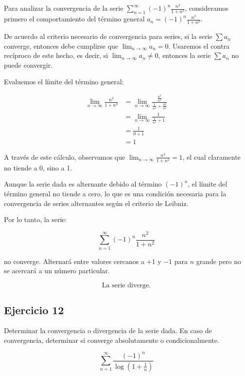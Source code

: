 \documentclass{article}
\begin{document}
    Para analizar la convergencia de la serie \(\sum_{n=1}^{\infty}(-1)^{n} \frac{n^{2}}{1+n^{2}}\), consideramos primero el comportamiento del término general \(a_n = (-1)^n \frac{n^2}{1+n^2}\).

    De acuerdo al criterio necesario de convergencia para series, si la serie \(\sum a_{n}\) converge, entonces debe cumplirse que \(\lim_{n \rightarrow \infty} a_{n} = 0\). Usaremos el contra recíproco de este hecho, es decir, si \(\lim_{n \rightarrow \infty} a_{n} \neq 0\), entonces la serie \(\sum a_{n}\) no puede convergir.

    Evaluemos el límite del término general:

    \begin{align*}
    \lim_{n \rightarrow \infty} \frac{n^{2}}{1+n^{2}} & = \lim_{n \rightarrow \infty} \frac{\frac{n^{2}}{n^{2}}}{\frac{1}{n^{2}}+\frac{n^{2}}{n^{2}}} \\
    & = \lim_{n \rightarrow \infty} \frac{1}{\frac{1}{n^{2}}+1} \\
    & = \frac{1}{0+1} \\
    & = 1
    \end{align*}

    A través de este cálculo, observamos que \(\lim_{n \rightarrow \infty} \frac{n^{2}}{1+n^{2}} = 1\), el cual claramente no tiende a 0, sino a 1.

    Aunque la serie dada es alternante debido al término \( (-1)^n \), el límite del término general no tiende a cero, lo que es una condición necesaria para la convergencia de series alternantes según el criterio de Leibniz.

    Por lo tanto, la serie:

    \[
    \sum_{n=1}^{\infty}(-1)^{n} \frac{n^{2}}{1+n^{2}}
    \]

    no converge. Alternará entre valores cercanos a \(+1\) y \(-1\) para \(n\) grande pero no se acercará a un número particular.

    \[
    \text{La serie diverge.}
    \]

    \subsection*{Ejercicio 12}

    Determinar la convergencia o divergencia de la serie dada. En caso de convergencia, determinar si converge absolutamente o condicionalmente.

    $$
    \sum_{n=1}^{\infty} \frac{(-1)^{n}}{\log \left(1+\frac{1}{n}\right)}
    $$
\end{document}
